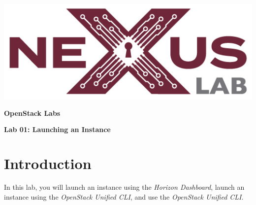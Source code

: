 \documentclass[letterpaper, 12pt]{article}
\begin{document}
\begin{titlepage}
    \centering
    \includegraphics[scale=0.5]{images/nexus_lab_logo.png}

    \vspace*{\baselineskip}

    \textbf{\Large OpenStack Labs}

    \vspace*{\baselineskip}

    \textbf{\Large Lab 01: Launching an Instance}
    \vspace*{\fill}
\end{titlepage}

{
    \fancyhf{}
    \fancyfoot[R]{\footnotesize\thepage}
    \renewcommand{\headrulewidth}{0pt}
}

\pagestyle{fancy}
\tableofcontents
\clearpage

\section*{Introduction}
\label{sec:introduction}
In this lab, you will launch an instance using the \textit{Horizon Dashboard}, launch an instance using the
\textit{OpenStack Unified CLI}, and use the \textit{OpenStack Unified CLI}.
\end{document}
